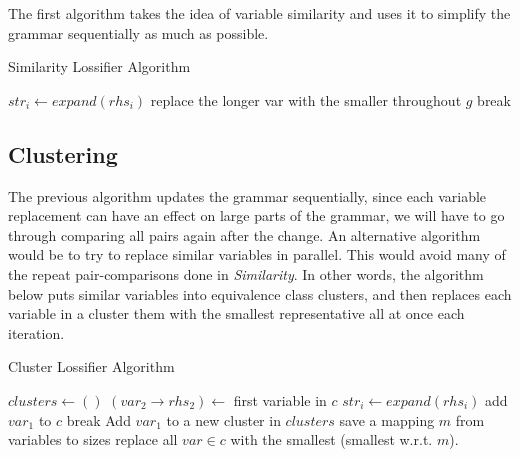 \documentclass[11pt]{article}
\begin{document}
The first algorithm takes the idea of variable similarity and uses it to
simplify the grammar sequentially as much as possible.

\begin{algorithm}[h]
\caption{Similarity Lossifier Algorithm}
\label{sim_alg}
\begin{algorithmic}[1]
 
      \State $str_{i} \gets expand(rhs_i)$
        \State replace the longer var with the smaller throughout $g$
        \State break
      \EndIf
    \EndFor
  \EndWhile
\EndProcedure
\end{algorithmic}
\end{algorithm}

\subsection{Clustering}

The previous algorithm updates the grammar sequentially, since each variable
replacement can have an effect on large parts of the grammar, we will have to
go through comparing all pairs again after the change.  An alternative
algorithm would be to try to replace similar variables in parallel. This would
avoid many of the repeat pair-comparisons done in \emph{Similarity}. In other
words, the algorithm below puts similar variables into equivalence class
clusters, and then replaces each variable in a cluster them with the smallest
representative all at once each iteration.

\begin{algorithm}[h]
\caption{Cluster Lossifier Algorithm}
\label{cluster_alg}
\begin{algorithmic}[1]
 
    \State $clusters \gets ()$
        \State $(var_2 \rightarrow rhs_2) \gets $ first variable in $c$
        \State $str_{i} \gets expand(rhs_i)$
          \State add $var_1$ to $c$
          \State break
        \EndIf
      \EndFor
        \State Add $var_1$ to a new cluster in $clusters$
      \EndIf
    \EndFor
    \State save a mapping $m$ from variables to sizes
      \State replace all $var \in c$ with the smallest (smallest w.r.t. $m$).
    \EndFor
  \EndWhile
\EndProcedure
\end{algorithmic}
\end{algorithm}
\end{document}
